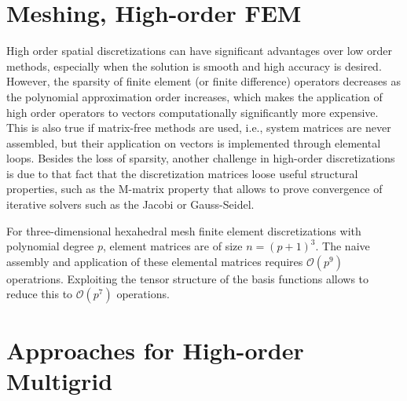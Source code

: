 \documentclass[times]{nlaauth}
\begin{document}
\section{Meshing, High-order FEM}


High order spatial discretizations can have significant advantages
over low order methods, especially when the solution is smooth and
high accuracy is desired. However, the sparsity of finite element (or
finite difference) operators decreases as the polynomial approximation
order increases, which makes the application of high order operators
to vectors computationally significantly more expensive. This is also
true if matrix-free methods are used, i.e., system matrices are never
assembled, but their application on vectors is implemented through
elemental loops.  Besides the loss of sparsity, another challenge in
high-order discretizations is due to that fact that the discretization
matrices loose useful structural properties, such as the M-matrix
property that allows to prove convergence of iterative solvers such as
the Jacobi or Gauss-Seidel.

For three-dimensional hexahedral mesh finite element discretizations
with polynomial degree $p$, element matrices are of size
$n=(p+1)^3$. The naive assembly and application of these elemental
matrices requires $\mathcal O(p^9)$ operatrions. Exploiting the tensor
structure of the basis functions allows to reduce this to $\mathcal
O(p^7)$ operations.





\section{Approaches for High-order Multigrid}
\end{document}
